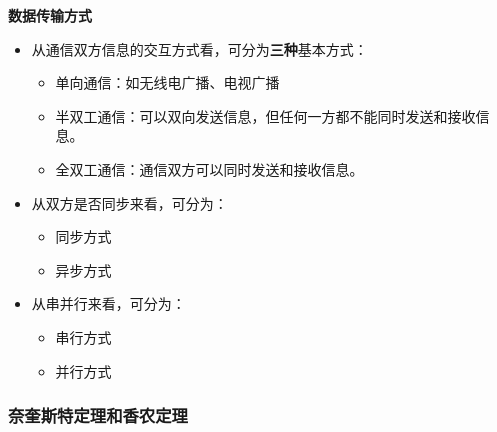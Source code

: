 \documentclass[12pt, a4paper, oneside]{ctexart}
\begin{document}
\textbf{数据传输方式}
\begin{itemize}
    \item 从通信双方信息的交互方式看，可分为\textbf{三种}基本方式：
    \begin{itemize}
        \item 单向通信：如无线电广播、电视广播
        \item 半双工通信：可以双向发送信息，但任何一方都不能同时发送和接收信息。
        \item 全双工通信：通信双方可以同时发送和接收信息。
    \end{itemize}
    \item 从双方是否同步来看，可分为：
    \begin{itemize}
        \item 同步方式
        \item 异步方式
    \end{itemize}
    \item 从串并行来看，可分为：
    \begin{itemize}
        \item 串行方式
        \item 并行方式
    \end{itemize}
\end{itemize}

\subsubsection{奈奎斯特定理和香农定理}
\end{document}
